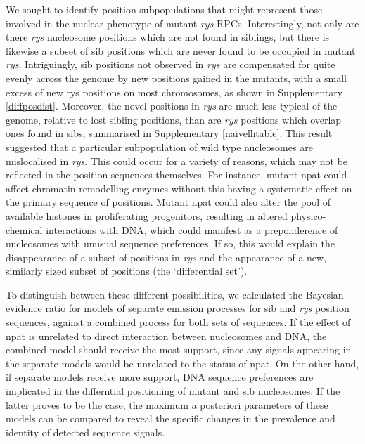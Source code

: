 We sought to identify position subpopulations that might represent those involved in the nuclear phenotype of mutant \textit{rys} RPCs. Interestingly, not only are there \textit{rys} nucleosome positions which are not found in siblings, but there is likewise a subset of sib positions which are never found to be occupied in mutant \textit{rys}. Intriguingly, sib positions not observed in \textit{rys} are compensated for quite evenly across the genome by new positions gained in the mutants, with a small excess of new rys positions on most chromosomes, as shown in Supplementary \autoref{diffposdist}. Moreover, the novel positions in \textit{rys} are much less typical of the genome, relative to lost sibling positions, than are \textit{rys} positions which overlap ones found in sibs, summarised in Supplementary \autoref{naivelhtable}. This result suggested that a particular subpopulation of wild type nucleosomes are mislocalised in \textit{rys}. This could occur for a variety of reasons, which may not be reflected in the position sequences themselves. For instance, mutant npat could affect chromatin remodelling enzymes without this having a systematic effect on the primary sequence of positions. Mutant npat could also alter the pool of available histones in proliferating progenitors, resulting in altered physico-chemical interactions with DNA, which could manifest as a preponderence of nucleosomes with unusual sequence preferences. If so, this would explain the disappearance of a subset of positions in \textit{rys} and the appearance of a new, similarly sized subset of positions (the `differential set').

To distinguish between these different possibilities, we calculated the Bayesian evidence ratio for models of separate emission processes for sib and \textit{rys} position sequences, against a combined process for both sets of sequences. If the effect of npat is unrelated to direct interaction between nucleosomes and DNA, the combined model should receive the most support, since any signals appearing in the separate models would be unrelated to the status of npat. On the other hand, if separate models receive more support, DNA sequence preferences are implicated in the differntial positioning of mutant and sib nucleosomes. If the latter proves to be the case, the maximum a posteriori parameters of these models can be compared to reveal the specific changes in the prevalence and identity of detected sequence signals.

